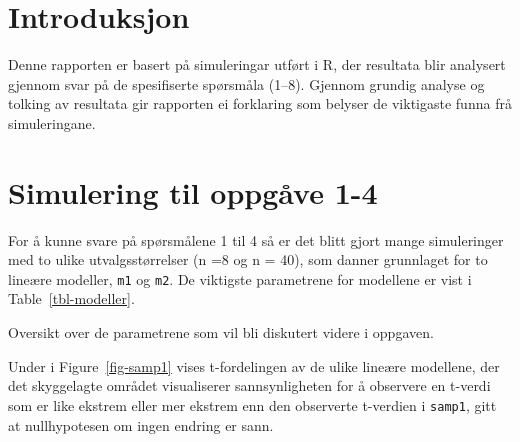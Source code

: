 \documentclass[
  letterpaper,
  DIV=11,
  numbers=noendperiod]{scrreprt}
\begin{document}

\chapter{Introduksjon}\label{introduksjon-4}

Denne rapporten er basert på simuleringar utført i R, der resultata blir
analysert gjennom svar på de spesifiserte spørsmåla (1--8). Gjennom
grundig analyse og tolking av resultata gir rapporten ei forklaring som
belyser de viktigaste funna frå simuleringane.


\chapter{Simulering til oppgåve
1-4}\label{simulering-til-oppguxe5ve-1-4}

For å kunne svare på spørsmålene 1 til 4 så er det blitt gjort mange
simuleringer med to ulike utvalgsstørrelser (n =8 og n = 40), som danner
grunnlaget for to lineære modeller, \texttt{m1} og \texttt{m2}. De
viktigste parametrene for modellene er vist i Table~\ref{tbl-modeller}.

\begin{table}

\caption{\label{tbl-modeller}Oversikt over de parametrene som vil bli
diskutert videre i oppgaven.}


\end{table}%

Under i Figure~\ref{fig-samp1} vises t-fordelingen av de ulike lineære
modellene, der det skyggelagte området visualiserer sannsynligheten for
å observere en t-verdi som er like ekstrem eller mer ekstrem enn den
observerte t-verdien i \texttt{samp1}, gitt at nullhypotesen om ingen
endring er sann.
\end{document}
